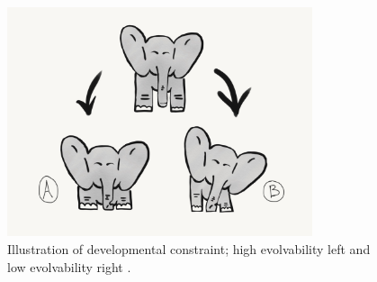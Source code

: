 \begin{figure}
    \centering
    \includegraphics[width=0.8\textwidth]{img/developmental_constraint}
 	\captionsetup{singlelinecheck=off,justification=raggedright}
  	\caption{Illustration of developmental constraint; high evolvability left and low evolvability right \cite{Smith1985DevelopmentalBiology,Tuinstra1990LackDevelopment}.}
    \label{fig:developmental_constraint}
\end{figure}